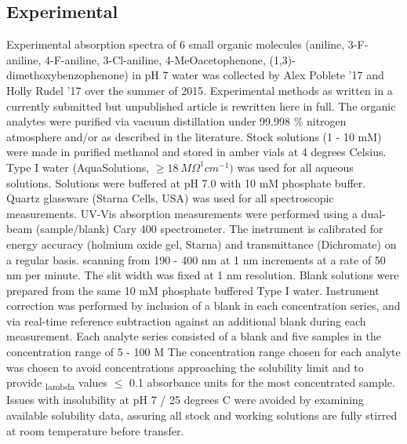 \documentclass[
journal=jpcbfk, %
manuscript=article]{achemso}
\begin{document}
	\subsection{Experimental} 
	Experimental absorption spectra of 6 small organic molecules (aniline, 3-F-aniline, 4-F-aniline, 3-Cl-aniline, 4-MeOacetophenone, (1,3)-dimethoxybenzophenone) in pH 7 water was collected by Alex Poblete '17 and Holly Rudel '17 over the summer of 2015. Experimental methods as written in a currently submitted but unpublished article\cite{Eustis2016} is rewritten here in full. The organic analytes were purified via vacuum distillation under 99.998 \% nitrogen atmosphere and/or as described in the literature\cite{Armarego2013}. Stock solutions (1 - 10 mM) were made in purified methanol and stored in amber vials at 4 degrees Celsius. Type I water (AquaSolutions, $ \geq 18\: M\Omega^{1}cm^{-1}) $ was used for all aqueous solutions.  Solutions were buffered at pH 7.0 with 10 mM phosphate buffer.  Quartz glassware (Starna Cells, USA) was used for all spectroscopic measurements. UV-Vis absorption measurements were performed using a dual-beam (sample/blank) Cary 400 spectrometer. The instrument is calibrated for energy accuracy (holmium oxide gel, Starna) and transmittance (Dichromate) on a regular basis.  scanning from 190 - 400 nm at 1 nm increments at a rate of 50 nm per minute.  The slit width was fixed at 1 nm resolution.  Blank solutions were prepared from the same 10 mM phosphate buffered Type I water.  Instrument correction was performed by inclusion of a blank in each concentration series, and via real-time reference subtraction against an additional blank during each measurement. Each analyte series consisted of a blank and five samples in the concentration range of 5 - 100 \textmu M  The concentration range chosen for each analyte was chosen to avoid concentrations approaching the solubility limit and to provide \textepsilon\textsubscript{lambda} values $\leq$ 0.1 absorbance units for the most concentrated sample.  Issues with insolubility at pH 7 / 25 degrees C were avoided by examining available solubility data\cite{Yalkowsky2016}, assuring all stock and working solutions are fully stirred at room temperature before transfer.
	
\end{document}
